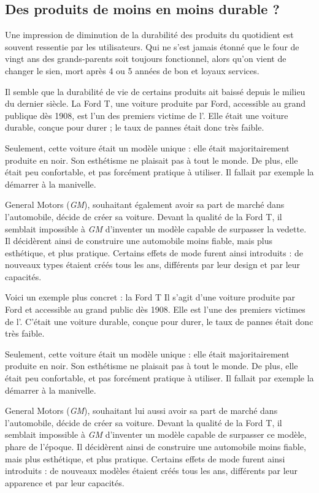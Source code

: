 \subsection{Des produits de moins en moins durable ?}

Une impression de diminution de la durabilité des produits du quotidient est souvent ressentie par les utilisateurs. Qui ne s'est jamais étonné que le four de vingt ans des grands-parents soit toujours fonctionnel, alors qu'on vient de changer le sien, mort après 4 ou 5 années de bon et loyaux services. 

Il semble que la durabilité de vie de certains produits ait baissé depuis le milieu du dernier siècle. 
\smallbreak
La Ford T, une voiture produite par Ford, accessible au grand publique dès 1908, est l'un des premiers victime de l'\op. Elle était une voiture durable, conçue pour durer ; le taux de pannes était donc très faible.   

Seulement, cette voiture était un modèle unique : elle était majoritairement produite en noir. Son esthétisme ne plaisait pas à tout le monde. De plus, elle était peu confortable, et pas forcément pratique à utiliser. Il fallait par exemple la démarrer à la manivelle. 

General Motors (\textit{GM}), souhaitant également avoir sa part de marché dans l'automobile, décide de créer sa voiture. Devant la qualité de la Ford T, il semblait impossible à \textit{GM} d'inventer un modèle capable de surpasser la vedette. Il décidèrent ainsi de construire une automobile moins fiable, mais plus esthétique, et plus pratique. Certains effets de mode furent ainsi introduits : de nouveaux types étaient créés tous les ans, différents par leur design et par leur capacités.


\smallbreak
Voici un exemple plus concret : la Ford T
Il s'agit d'une voiture produite par Ford et accessible au grand public dès 1908.
Elle est l'une des premiers victimes de l'\op.
C'était une voiture durable, conçue pour durer, le taux de pannes était donc très faible.   

Seulement, cette voiture était un modèle unique : elle était majoritairement produite en noir. Son esthétisme ne plaisait pas à tout le monde. De plus, elle était peu confortable, et pas forcément pratique à utiliser. Il fallait par exemple la démarrer à la manivelle. 

General Motors (\textit{GM}), souhaitant lui aussi avoir sa part de marché dans l'automobile, décide de créer sa voiture.
Devant la qualité de la Ford T, il semblait impossible à \textit{GM} d'inventer un modèle capable de surpasser ce modèle, phare de l'époque.
Il décidèrent ainsi de construire une automobile moins fiable, mais plus esthétique, et plus pratique.
Certains effets de mode furent ainsi introduits : de nouveaux modèles étaient créés tous les ans, différents par leur apparence et par leur capacités.

